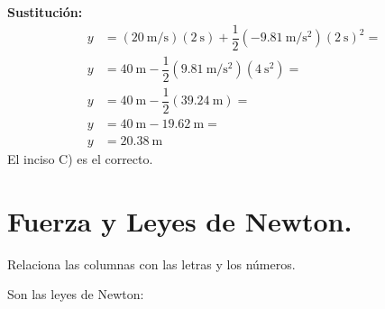 \documentclass[12pt, letter]{exam}
\begin{document}
\begin{questions}
    \textbf{Sustitución:}
    \begin{align*}
    y &= \left( \SI[per-mode=fraction]{20}{\meter\per\second} \right) (\SI{2}{\second}) + \dfrac{1}{2} \left( -\SI[per-mode=fraction]{9.81}{\meter\per\square\second} \right) \left( \SI{2}{\second} \right)^{2} = \\[0.5em]
    y &= \SI{40}{\meter} - \dfrac{1}{2} \left( \SI[per-mode=fraction]{9.81}{\meter\per\square\second} \right) \left( \SI{4}{\square\second} \right) = \\[0.5em]
    y &= \SI{40}{\meter} - \dfrac{1}{2} (\SI{39.24}{\meter}) = \\[0.5em]
    y &= \SI{40}{\meter} - \SI{19.62}{\meter} = \\[0.5em]
    y &= \SI{20.38}{\meter}
    \end{align*}
    El inciso C) es el correcto.

    \section{Fuerza y Leyes de Newton.}

    \question Relaciona las columnas con las letras y los números.
    
    Son las leyes de Newton:
    
    \begin{minipage}[t]{0.4\linewidth}
\end{minipage}
\end{questions}
\end{document}
